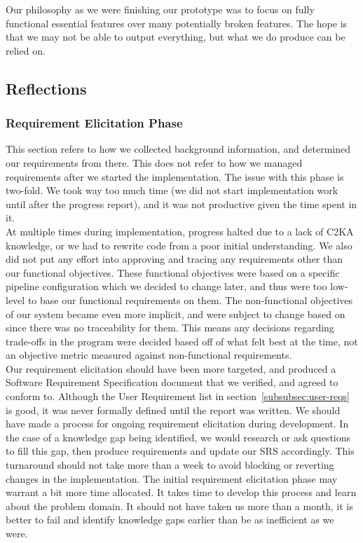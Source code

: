 Our philosophy as we were finishing our prototype was to focus on fully functional essential features over many potentially broken features.
The hope is that we may not be able to output everything, but what we do produce can be relied on.


\subsection{Reflections}\label{subsec:reflections}
\subsubsection{Requirement Elicitation Phase}
This section refers to how we collected background information, and determined our requirements from there.
This does not refer to how we managed requirements after we started the implementation.
The issue with this phase is two-fold.
We took way too much time (we did not start implementation work until after the progress report),
and it was not productive given the time spent in it.\\

At multiple times during implementation, progress halted due to a lack of C2KA knowledge,
or we had to rewrite code from a poor initial understanding.
We also did not put any effort into approving and tracing any requirements other than our functional objectives.
These functional objectives were based on a specific pipeline configuration which we decided to change later,
and thus were too low-level to base our functional requirements on them.
The non-functional objectives of our system became even more implicit, and were subject to change based on
since there was no traceability for them.
This means any decisions regarding trade-offs in the program were decided based off of what felt best at the time,
not an objective metric measured against non-functional requirements.\\

Our requirement elicitation should have been more targeted, and produced a Software Requirement Specification document
that we verified, and agreed to conform to.
Although the User Requirement list in section~\ref{subsubsec:user-reqs} is good,
it was never formally defined until the report was written.
We should have made a process for ongoing requirement elicitation during development.
In the case of a knowledge gap being identified, we would research or ask questions to fill this gap,
then produce requirements and update our SRS accordingly.
This turnaround should not take more than a week to avoid blocking or reverting changes in the implementation.
The initial requirement elicitation phase may warrant a bit more time allocated.
It takes time to develop this process and learn about the problem domain.
It should not have taken us more than a month,
it is better to fail and identify knowledge gaps earlier than be as inefficient as we were.

